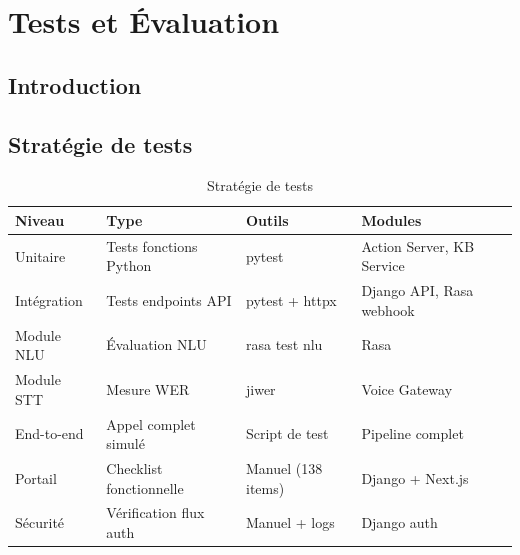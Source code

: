 \chapter{Tests et \'Evaluation}
\minitoc


\section{Introduction}


\section{Stratégie de tests}

\begin{table}[H]
  \centering
  \caption{Stratégie de tests}
  \label{tab:test_strategy}
  \begin{tabularx}{\textwidth}{lXXX}
    \toprule
    \textbf{Niveau} & \textbf{Type} & \textbf{Outils} & \textbf{Modules} \\
    \midrule
    Unitaire      & Tests fonctions Python       & pytest                & Action Server, KB Service \\
    Intégration   & Tests endpoints API          & pytest + httpx        & Django API, Rasa webhook \\
    Module NLU    & Évaluation NLU               & rasa test nlu         & Rasa \\
    Module STT    & Mesure \ac{WER}               & jiwer                 & Voice Gateway \\
    End-to-end    & Appel complet simulé         & Script de test        & Pipeline complet \\
    Portail       & Checklist fonctionnelle      & Manuel (138 items)    & Django + Next.js \\
    Sécurité      & Vérification flux auth       & Manuel + logs         & Django auth \\
    \bottomrule
  \end{tabularx}
\end{table}

